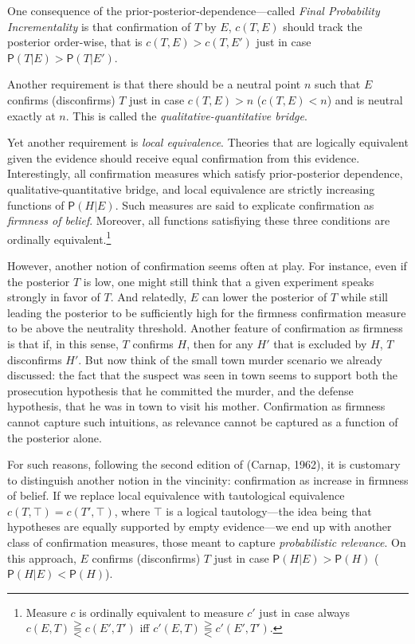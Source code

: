 \documentclass[
  10pt,
  dvipsnames,enabledeprecatedfontcommands]{scrartcl}
\newcommand{\pr}[1]{\mathsf{P}(#1)}
\begin{document}
One consequence of the prior-posterior-dependence---called
\emph{Final Probability Incrementality} is that confirmation of \(T\) by
\(E\), \(c(T,E)\) should track the posterior order-wise, that is
\(c(T,E)>c(T,E')\) just in case \(\pr{T\vert E} > \pr{T\vert E'}\).

Another requirement is that there should be a neutral point \(n\) such
that \(E\) confirms (disconfirms) \(T\) just in case \(c(T,E)>n\)
(\(c(T,E)<n\)) and is neutral exactly at \(n\). This is called the
\emph{qualitative-quantitative bridge}.

Yet another requirement is \emph{local equivalence}. Theories that are
logically equivalent given the evidence should receive equal
confirmation from this evidence. Interestingly, all confirmation
measures which satisfy prior-posterior dependence,
qualitative-quantitative bridge, and local equivalence are strictly
increasing functions of \(\pr{H \vert E}\). Such measures are said to
explicate confirmation as \emph{firmness of belief}. Moreover, all
functions satisfiying these three conditions are ordinally
equivalent.\footnote{Measure $c$ is ordinally equivalent to measure $c'$ just in case always $c(E , T) \gtreqqless c(E', T')$ iff $c'(E , T) \gtreqqless c'(E' , T')$.}

However, another notion of confirmation seems often at play. For
instance, even if the posterior \(T\) is low, one might still think that
a given experiment speaks strongly in favor of \(T\). And relatedly,
\(E\) can lower the posterior of \(T\) while still leading the posterior
to be sufficiently high for the firmness confirmation measure to be
above the neutrality threshold. Another feature of confirmation as
firmness is that if, in this sense, \(T\) confirms \(H\), then for any
\(H'\) that is excluded by \(H\), \(T\) disconfirms \(H'\). But now
think of the small town murder scenario we already discussed: the fact
that the suspect was seen in town seems to support both the prosecution
hypothesis that he committed the murder, and the defense hypothesis,
that he was in town to visit his mother. Confirmation as firmness cannot
capture such intuitions, as relevance cannot be captured as a function
of the posterior alone.

For such reasons, following the second edition of (Carnap, 1962), it is
customary to distinguish another notion in the vincinity: confirmation
as increase in firmness of belief. If we replace local equivalence with
tautological equivalence \(c(T, \top) = c(T', \top)\), where \(\top\) is
a logical tautology---the idea being that hypotheses are equally
supported by empty evidence---we end up with another class of
confirmation measures, those meant to capture
\emph{probabilistic relevance}. On this approach, \(E\) confirms
(disconfirms) \(T\) just in case \(\pr{H \vert E} > \pr{H}\)
(\(\pr{H \vert E} < \pr{H}\)).
\end{document}
